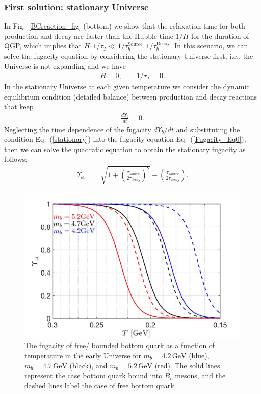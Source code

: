 \subsubsection{First solution: stationary Universe}
In Fig.~\ref{BCreaction_fig} (bottom) we show that the relaxation time for both production and decay are faster than the Hubble time $1/H$ for the duration of QGP, which implies that $H,1/\tau_T\ll1/\tau_{b}^{\mathrm{Source}},1/\tau^{\mathrm{Decay}}_b$. In this scenario, we can solve the fugacity equation by considering the stationary Universe first, i.e., the Universe is not expanding and we have
\begin{align}\label{stationary}
H=0,\qquad1/\tau_T=0.
\end{align} 
In the stationary Universe at each given temperature we consider the dynamic equilibrium condition (detailed balance) between production and decay reactions that keep
\begin{align}
\frac{d\Upsilon_b}{dt}=0.
\end{align}
Neglecting the time dependence of the fugacity $d\Upsilon_b/dt$ and substituting the condition Eq.~(\ref{stationary}) into the fugacity equation Eq.~(\ref{Fugacity_Eq0}), then we can solve the quadratic equation to obtain the stationary fugacity as follows:
\begin{align}
\label{Fugacity_Sol}
\Upsilon_{\mathrm{st}}&=\sqrt{1+\left(\frac{\tau_{source}}{2\tau_{decay}}\right)^2}-\left(\frac{\tau_{source}}{2\tau_{decay}}\right).
\end{align}
\begin{figure}[ht]
\begin{center}
\includegraphics[width=\textwidth]{./plots/BquarkFugacity_tot}
\caption{The fugacity of free/ bounded bottom quark as a function of temperature in the early Universe for $m_b=4.2\,\mathrm{GeV}$ (blue), $m_b=4.7\,\mathrm{GeV}$ (black), and $m_b=5.2\,\mathrm{GeV}$ (red). The solid lines represent the case bottom quark bound into $B_c$ mesons, and the dashed lines label the case of  free bottom quark.}
\label{fugacity_bc}
\end{center}
\end{figure}

